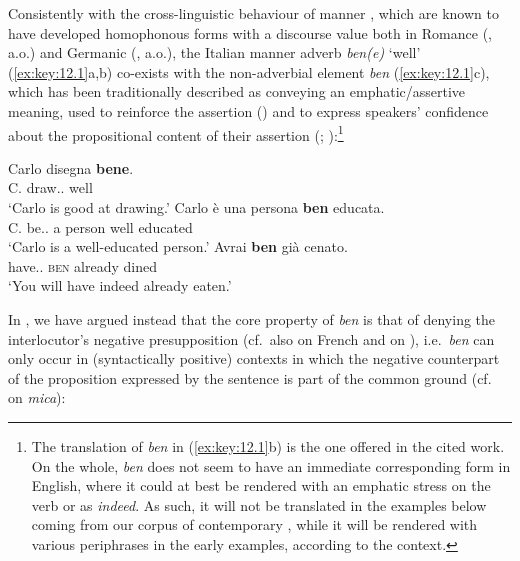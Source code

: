\documentclass[output=paper]{langsci/langscibook}
\begin{document}
\largerpage[-2]
Consistently with the cross-linguistic behaviour of manner , which are
known to have developed  homophonous forms with a discourse value both in
Romance (\citealt{Belletti1990,Belletti1994,Lonzi1991,Cinque1976,Cinque1999,%
Vinet1996,WalDet2007,Coniglio2008,Hernanz2010,Cardinaletti2011,PadPen2014},
a.o.) and Germanic (\citealt{Weydt1969,Baardewyk-Resseguier1991}, a.o.), the
Italian manner adverb \emph{ben(e)} ‘well’ (\ref{ex:key:12.1}a,b) co-exists with the
non-adverbial element \emph{ben} (\ref{ex:key:12.1}c), which has been traditionally described
as conveying an em\-phat\-ic/as\-sertive meaning, used to
reinforce the assertion (\citealt{Belletti1990,Belletti1994,Lonzi1991}) and
to express speakers’ confidence about the propositional content of their
assertion (\citealt{Coniglio2008}; \citealt{Cardinaletti2011}):\footnote{The
    translation of \emph{ben} in (\ref{ex:key:12.1}b) is the one offered in the cited work. On
    the whole, \emph{ben} does not seem to have an immediate corresponding form
    in English, where it could at best be rendered with an emphatic stress on
    the verb or as \emph{indeed}. As such, it will not be translated in the
examples below coming from our corpus of contemporary , while it will be
rendered with various periphrases in the early examples, according to the
context.}

\ea\label{ex:key:12.1} 
	\ea
		\gll    Carlo disegna \textbf{bene}.\\
			    C.  draw.\Prs{}.\Tsg{}  well\\
        \glt    \enquote*{Carlo is good at drawing.}
	\ex
		\gll    Carlo è una persona \textbf{ben} educata.\\
			    C.  be.\Prs.\Tsg{} a person well  educated\\
        \glt    \enquote*{Carlo is a well-educated person.}
    \ex
		\gll    Avrai \textbf{ben} già cenato.\\
			    have.\Fut{}.\Ssg{} \textsc{ben} already dined\\
        \glt    \enquote*{You will have indeed already
                eaten.}\hspace{\fill}\parencite[171, fn.\ 20]{Cinque1999}
	\z
\z

In \textcite{CognSchi2018b,CognSchi2018}, we have argued instead that the core
property of  \emph{ben} is that of denying the interlocutor’s negative
presupposition (cf.\ also \citealt{WalDet2007} on French and
\citealt{Hernanz2010} on ), i.e.\ \emph{ben} can only occur in
(syntactically positive) contexts in which the negative counterpart of the
proposition expressed by the sentence is part of the common ground (cf.\
\citealt{Cinque1976} on \emph{mica}):
\end{document}
